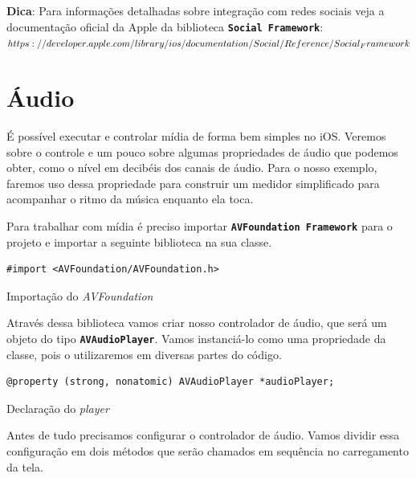 \documentclass[a4paper,12pt,brazil,doubleside]{book}
\begin{document}
\begin{singlespace}
\begin{framed}

\textbf{Dica}: Para informações detalhadas sobre integração com redes sociais veja a documentação oficial da Apple da biblioteca \texttt{\textbf{Social Framework}}:\\
\(https://developer.apple.com/library/ios/documentation/Social/Reference/\\Social_Framework\)
\end{framed}

\section{Áudio}


É possível executar e controlar mídia de forma bem simples no iOS. Veremos sobre o controle e um pouco sobre algumas propriedades de áudio que podemos obter, como o nível em decibéis dos canais de áudio. Para o nosso exemplo, faremos uso dessa propriedade para construir um medidor simplificado para acompanhar o ritmo da música enquanto ela toca.

Para trabalhar com mídia é preciso importar \texttt{\textbf{AVFoundation Framework}} para o projeto e importar a seguinte biblioteca na sua classe.

\begin{listing}[H]
\begin{verbatim}
#import <AVFoundation/AVFoundation.h>
\end{verbatim}
\caption{Importação do \emph{AVFoundation}}
\end{listing}


Através dessa biblioteca vamos criar nosso controlador de áudio, que será um objeto do tipo \texttt{\textbf{AVAudioPlayer}}. Vamos instanciá-lo como uma propriedade da classe, pois o utilizaremos em diversas partes do código.

\begin{listing}[H]
\begin{verbatim}
@property (strong, nonatomic) AVAudioPlayer *audioPlayer;
\end{verbatim}
\caption{Declaração do \emph{player}}
\end{listing}


Antes de tudo precisamos configurar o controlador de áudio. Vamos dividir essa configuração em dois métodos que serão chamados em sequência no carregamento da tela.


\end{singlespace}
\end{document}
